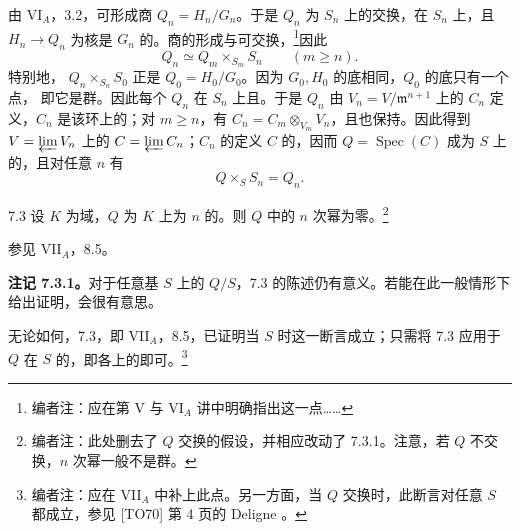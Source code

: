 由 VI$_A$，3.2，可形成商 $Q_n=H_n/G_n$。于是 $Q_n$ 为 $S_n$ 上的交换，在 $S_n$ 上，且 $H_n\to Q_n$ 为核是 $G_n$ 的。商的形成与可交换，\footnote[37]{编者注：应在第 V 与 VI$_A$ 讲中明确指出这一点……}因此
\[
Q_n\simeq Q_m\times_{S_m}S_n\qquad(m\geq n).
\]
特别地， $Q_n\times_{S_n}S_0$ 正是 $Q_0=H_0/G_0$。因为 $G_0,H_0$ 的底相同，$Q_0$ 的底只有一个点，
即它是群。因此每个 $Q_n$ 在 $S_n$ 上且。于是 $Q_n$ 由 $V_n=V/\mathfrak m^{n+1}$ 上的 $C_n$ 定义，$C_n$ 是该环上的；对 $m\geq n$，有 $C_n=C_m\otimes_{V_m}V_n$，且也保持。因此得到 $V=\varprojlim V_n$ 上的 $C=\varprojlim C_n$；$C_n$ 的定义 $C$ 的，因而 $Q=\operatorname{Spec}(C)$ 成为 $S$ 上的，且对任意 $n$ 有
\[
Q\times_SS_n=Q_n.
\]
\begin{SGAresult}{}{7.3}
设 $K$ 为域，$Q$ 为 $K$ 上为 $n$ 的。则 $Q$ 中的 $n$ 次幂为零。\footnote[38]{编者注：此处删去了 $Q$ 交换的假设，并相应改动了 7.3.1。注意，若 $Q$ 不交换，$n$ 次幂一般不是群。}
\end{SGAresult}
参见 VII$_A$，8.5。

\textbf{注记 7.3.1。}对于任意基 $S$ 上的 $Q/S$，7.3 的陈述仍有意义。若能在此一般情形下给出证明，会很有意思。

无论如何，7.3，即 VII$_A$，8.5，已证明当 $S$ 时这一断言成立；只需将 7.3 应用于 $Q$ 在 $S$ 的，即各上的即可。\footnote[39]{编者注：应在 VII$_A$ 中补上此点。另一方面，当 $Q$ 交换时，此断言对任意 $S$ 都成立，参见 [TO70] 第 4 页的 Deligne 。}

